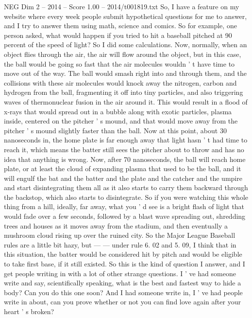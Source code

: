 \begin{textsample}{NEG Dim 2 – 2014 – Score 1.00 – 2014/t001819.txt}  \label{ex:f2_neg_035}
So, I have a feature on my website where every week people submit hypothetical questions for me to answer, and I try to answer them using math, science and comics.
So for example, one person asked, what would happen if you tried to hit a baseball pitched at 90 percent of the speed of light?
So I did some calculations.
Now, normally, when an object flies through the air, the air will flow around the object, but in this case, the ball would be going so fast that the air molecules wouldn ' t have time to move out of the way.
The ball would smash right into and through them, and the collisions with these air molecules would knock away the nitrogen, carbon and hydrogen from the ball, fragmenting it off into tiny particles, and also triggering waves of thermonuclear fusion in the air around it.
This would result in a flood of x-rays that would spread out in a bubble along with exotic particles, plasma inside, centered on the pitcher ' s mound, and that would move away from the pitcher ' s mound slightly faster than the ball.
Now at this point, about 30 nanoseconds in, the home plate is far enough away that light hasn ' t had time to reach it, which means the batter still sees the pitcher about to throw and has no idea that anything is wrong.
Now, after 70 nanoseconds, the ball will reach home plate, or at least the cloud of expanding plasma that used to be the ball, and it will engulf the bat and the batter and the plate and the catcher and the umpire and start disintegrating them all as it also starts to carry them backward through the backstop, which also starts to disintegrate.
So if you were watching this whole thing from a hill, ideally, far away, what you ' d see is a bright flash of light that would fade over a few seconds, followed by a blast wave spreading out, shredding trees and houses as it moves away from the stadium, and then eventually a mushroom cloud rising up over the ruined city.
So the Major League Baseball rules are a little bit hazy, but — — under rule 6. 02 and 5. 09, I think that in this situation, the batter would be considered hit by pitch and would be eligible to take first base, if it still existed.
So this is the kind of question I answer, and I get people writing in with a lot of other strange questions.
I ' ve had someone write and say, scientifically speaking, what is the best and fastest way to hide a body?
Can you do this one soon?
And I had someone write in, I ' ve had people write in about, can you prove whether or not you can find love again after your heart ' s broken?

\end{textsample}
